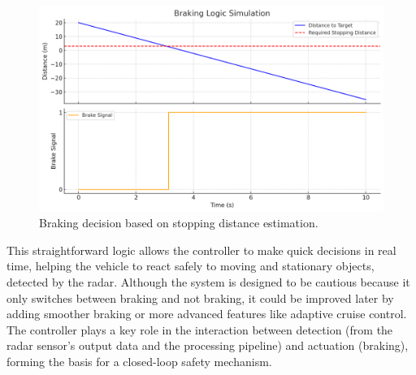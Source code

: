 \begin{figure}[!htbp]
    \centering
    \includegraphics[width=0.8\linewidth]{images/brakeSignal.png}
    \caption{Braking decision based on stopping distance estimation.}
    \label{fig:braking_logic}
\end{figure}
This straightforward logic allows the controller to make quick decisions in real time, helping the vehicle to react safely to moving and stationary objects, detected by the radar.
Although the system is designed to be cautious because it only switches between braking and not braking, it could be improved later by adding smoother braking or more advanced features like adaptive cruise control.
The controller plays a key role in the interaction between detection (from the radar sensor's output data and the processing pipeline) and actuation (braking), forming the basis for a closed-loop safety mechanism.